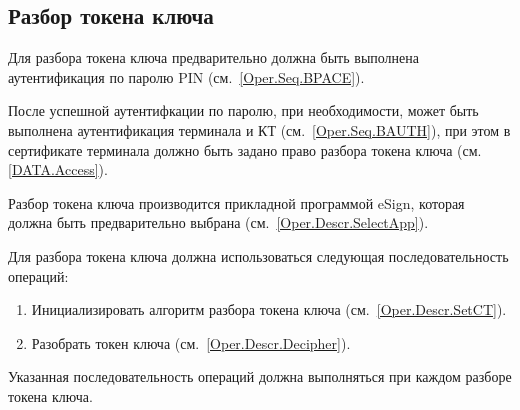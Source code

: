 \subsection{Разбор токена ключа}
\label{Oper.Seq.Decipher}

Для разбора токена ключа предварительно 
должна быть выполнена аутентификация по 
паролю PIN  (см.~\ref{Oper.Seq.BPACE}).

После успешной аутентифкации по паролю,
при необходимости, может быть выполнена аутентификация 
терминала и КТ (см.~\ref{Oper.Seq.BAUTH}),
при этом в сертификате терминала должно быть задано право
разбора токена ключа (см. \ref{DATA.Access}).

Разбор токена ключа производится прикладной программой eSign, которая
должна быть предварительно выбрана (см.~\ref{Oper.Descr.SelectApp}).

Для разбора токена ключа должна использоваться 
следующая последовательность операций:
%
\begin{enumerate}
\item Инициализировать алгоритм разбора токена ключа (см.~\ref{Oper.Descr.SetCT}).
\item Разобрать токен ключа (см.~\ref{Oper.Descr.Decipher}).
\end{enumerate}
%
Указанная последовательность операций должна выполняться
при каждом разборе токена ключа.
